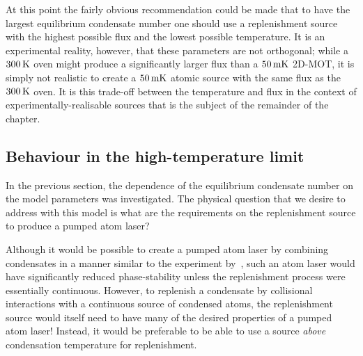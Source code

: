 At this point the fairly obvious recommendation could be made that to have the largest equilibrium condensate number one should use a replenishment source with the highest possible flux and the lowest possible temperature.  It is an experimental reality, however, that these parameters are not orthogonal; while a $\unit[300]{K}$ oven might produce a significantly larger flux than a $\unit[50]{mK}$ 2D-MOT, it is simply not realistic to create a $\unit[50]{mK}$ atomic source with the same flux as the $\unit[300]{K}$ oven.  It is this trade-off between the temperature and flux in the context of experimentally-realisable sources that is the subject of the remainder of the chapter.




\subsection{Behaviour in the high-temperature limit}
In the previous section, the dependence of the equilibrium condensate number on the model parameters was investigated. The physical question that we desire to address with this model is what are the requirements on the replenishment source to produce a pumped atom laser?

Although it would be possible to create a pumped atom laser by combining condensates in a manner similar to the experiment by~\citet{Chikkatur:2002qa}, such an atom laser would have significantly reduced phase-stability unless the replenishment process were essentially continuous. However, to replenish a condensate by collisional interactions with a continuous source of condensed atoms, the replenishment source would itself need to have many of the desired properties of a pumped atom laser! Instead, it would be preferable to be able to use a source \emph{above} condensation temperature for replenishment.

